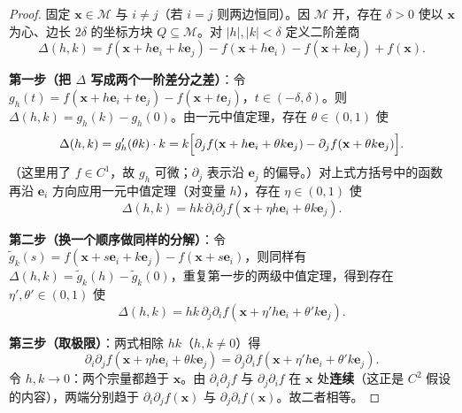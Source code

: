 \begin{proof}
固定 $\mathbf x\in\mathcal M$ 与 $i\ne j$（若 $i=j$ 则两边恒同）。因 $\mathcal M$ 开，存在 $\delta>0$ 使以 $\mathbf x$ 为心、边长 $2\delta$ 的坐标方块 $Q\subseteq\mathcal M$。对 $|h|,|k|<\delta$ 定义二阶差商
\[
\Delta(h,k) = f(\mathbf x+h\mathbf e_i+k\mathbf e_j) - f(\mathbf x+h\mathbf e_i) - f(\mathbf x+k\mathbf e_j) + f(\mathbf x).
\]

\textbf{第一步（把 $\Delta$ 写成两个一阶差分之差）}：令 $g_h(t) = f(\mathbf x+h\mathbf e_i+t\mathbf e_j) - f(\mathbf x+t\mathbf e_j)$，$t\in(-\delta,\delta)$。则 $\Delta(h,k) = g_h(k)-g_h(0)$。由一元中值定理，存在 $\theta\in(0,1)$ 使
\[
\Delta(h,k) = g_h'(\theta k)\cdot k
= k\Bigl[\partial_j f(\mathbf x+h\mathbf e_i+\theta k\mathbf e_j) - \partial_j f(\mathbf x+\theta k\mathbf e_j)\Bigr].
\]
（这里用了 $f\in C^1$，故 $g_h$ 可微；$\partial_j$ 表示沿 $\mathbf e_j$ 的偏导。）对上式方括号中的函数再沿 $\mathbf e_i$ 方向应用一元中值定理（对变量 $h$），存在 $\eta\in(0,1)$ 使
\[
\Delta(h,k) = hk\,\partial_i\partial_j f(\mathbf x+\eta h\mathbf e_i+\theta k\mathbf e_j).
\]

\textbf{第二步（换一个顺序做同样的分解）}：令 $\tilde g_k(s) = f(\mathbf x+s\mathbf e_i+k\mathbf e_j)-f(\mathbf x+s\mathbf e_i)$，则同样有 $\Delta(h,k)=\tilde g_k(h)-\tilde g_k(0)$，重复第一步的两级中值定理，得到存在 $\eta',\theta'\in(0,1)$ 使
\[
\Delta(h,k) = hk\,\partial_j\partial_i f(\mathbf x+\eta' h\mathbf e_i+\theta' k\mathbf e_j).
\]

\textbf{第三步（取极限）}：两式相除 $hk$（$h,k\ne0$）得
\[
\partial_i\partial_j f(\mathbf x+\eta h\mathbf e_i+\theta k\mathbf e_j)
= \partial_j\partial_i f(\mathbf x+\eta' h\mathbf e_i+\theta' k\mathbf e_j).
\]
令 $h,k\to0$：两个宗量都趋于 $\mathbf x$。由 $\partial_i\partial_j f$ 与 $\partial_j\partial_i f$ 在 $\mathbf x$ 处\textbf{连续}（这正是 $C^2$ 假设的内容），两端分别趋于 $\partial_i\partial_j f(\mathbf x)$ 与 $\partial_j\partial_i f(\mathbf x)$。故二者相等。
\end{proof}

